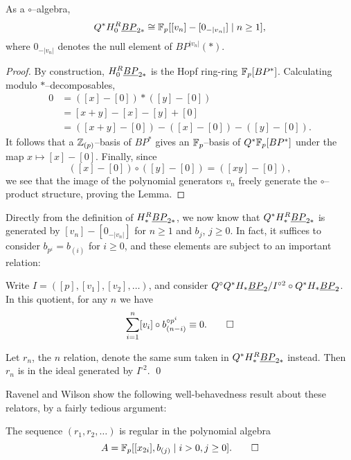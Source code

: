 \begin{lemma}
As a $\circ$--algebra, \[Q^* H_0^R \underline{\smash{BP}}_{2*} \cong \mathbb F_p[[v_n] - [0_{-|v_n|}] \mid n \ge 1],\] where $0_{-|v_n|}$ denotes the null element of $BP^{|v_n|}(*)$.
\end{lemma}
\begin{proof}
By construction, $H_0^R \underline{\smash{BP}}_{2*}$ is the Hopf ring-ring $\mathbb F_p[BP^*]$.  Calculating modulo $\ast$--decomposables,
\begin{align*}
0 & = ([x] - [0]) \ast ([y] - [0]) \\
& = [x + y] - [x] - [y] + [0] \\
& = ([x + y] - [0]) - ([x] - [0]) - ([y] - [0]).
\end{align*}
It follows that a $\mathbb Z_{(p)}$--basis of $BP^*$ gives an $\mathbb F_p$--basis of $Q^* \mathbb F_p[BP^*]$ under the map $x \mapsto [x] - [0]$.  Finally, since \[([x] - [0]) \circ ([y] - [0]) = ([xy] - [0]),\] we see that the image of the polynomial generators $v_n$ freely generate the $\circ$--product structure, proving the Lemma.
\end{proof}

Directly from the definition of $H_*^R \underline{\smash{BP}}_{2*}$, we now know that $Q^* H_*^R \underline{\smash{BP}}_{2*}$ is generated by $[v_n] - [0_{-|v_n|}]$ for $n \ge 1$ and $b_j$, $j \ge 0$.  In fact, it suffices to consider $b_{p^i} = b_{(i)}$ for $i \ge 0$, and these elements are subject to an important relation:

\begin{lemma}
Write $I = ([p], [v_1], [v_2], \ldots)$, and consider $Q^\circ Q^* H_* \underline{\smash{BP}}_{2} / I^{\circ 2} \circ Q^* H_* \underline{\smash{BP}}_{2}$.  In this quotient, for any $n$ we have \[\sum_{i=1}^n [v_i] \circ b_{(n-i)}^{\circ p^i} \equiv 0. \qed\]
\end{lemma}

\begin{corollary}
Let $r_n$, the $n${\th} relation, denote the same sum taken in $Q^* H_*^R \underline{\smash{BP}}_{2*}$ instead.  Then $r_n$ is in the ideal generated by $I^{\circ 2}$. \qed {}
\end{corollary}

Ravenel and Wilson show the following well-behavedness result about these relators, by a fairly tedious argument:

\begin{lemma}
The sequence $(r_1, r_2, \ldots)$ is regular in the polynomial algebra \[A = \mathbb F_p[[x_{2i}], b_{(j)} \mid i > 0, j \ge 0]. \qed\]
\end{lemma}

